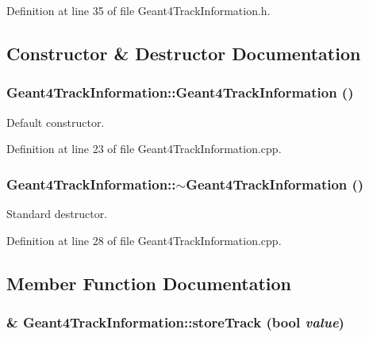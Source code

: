 Definition at line 35 of file Geant4TrackInformation.h.

\subsection{Constructor \& Destructor Documentation}
\hypertarget{class_d_d4hep_1_1_simulation_1_1_geant4_track_information_af654942e019813e21dd67c40cb964067}{
\subsubsection[{Geant4TrackInformation}]{\setlength{\rightskip}{0pt plus 5cm}Geant4TrackInformation::Geant4TrackInformation ()}}
\label{class_d_d4hep_1_1_simulation_1_1_geant4_track_information_af654942e019813e21dd67c40cb964067}


Default constructor. 

Definition at line 23 of file Geant4TrackInformation.cpp.\hypertarget{class_d_d4hep_1_1_simulation_1_1_geant4_track_information_a6867e8c464d4584ce8c3bb7f4041b504}{
\subsubsection[{$\sim$Geant4TrackInformation}]{\setlength{\rightskip}{0pt plus 5cm}Geant4TrackInformation::$\sim$Geant4TrackInformation ()}}
\label{class_d_d4hep_1_1_simulation_1_1_geant4_track_information_a6867e8c464d4584ce8c3bb7f4041b504}


Standard destructor. 

Definition at line 28 of file Geant4TrackInformation.cpp.

\subsection{Member Function Documentation}
\hypertarget{class_d_d4hep_1_1_simulation_1_1_geant4_track_information_a91857ec9a2cddd66aeac8e5de17cbe4a}{
\subsubsection[{storeTrack}]{ \& Geant4TrackInformation::storeTrack (bool {\em value})}}
\label{class_d_d4hep_1_1_simulation_1_1_geant4_track_information_a91857ec9a2cddd66aeac8e5de17cbe4a}


